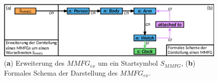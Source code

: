 %
\begin{figure}[htb]
    \centering
    \includegraphics[width=\textwidth]{chapter/chapter_2/mmfg/formal/formal-schema-mmfg-ex.eps}
    \caption{(\textbf{a}) Erweiterung des $MMFG_{ex}$ um ein Startsymbol $S_{MMFG}$, (\textbf{b}) Formales Schema der Darstellung des $MMFG_{ex}$.}
    \label{sec2:sota:subsec:fz-explainablity:fig:mmfg-add-start}
\end{figure}

